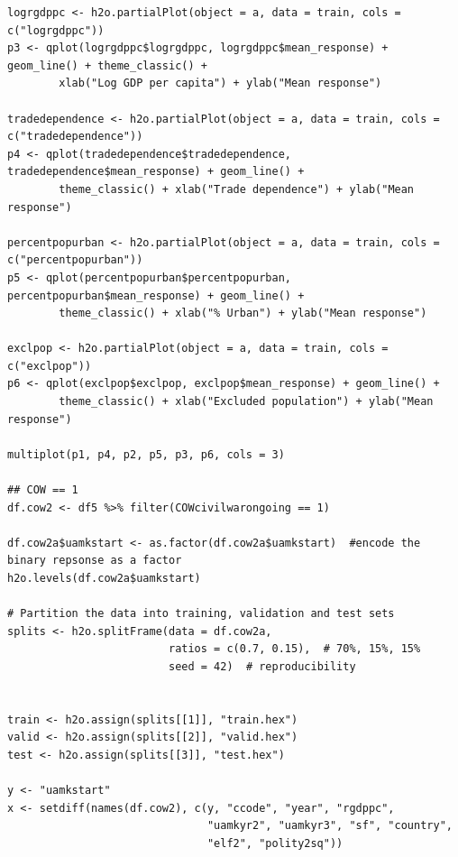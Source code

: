 \documentclass[a4paper,12pt]{article}
\begin{document}
\begin{verbatim}
logrgdppc <- h2o.partialPlot(object = a, data = train, cols = c("logrgdppc"))
p3 <- qplot(logrgdppc$logrgdppc, logrgdppc$mean_response) + geom_line() + theme_classic() +
        xlab("Log GDP per capita") + ylab("Mean response")

tradedependence <- h2o.partialPlot(object = a, data = train, cols = c("tradedependence"))
p4 <- qplot(tradedependence$tradedependence, tradedependence$mean_response) + geom_line() +
        theme_classic() + xlab("Trade dependence") + ylab("Mean response")

percentpopurban <- h2o.partialPlot(object = a, data = train, cols = c("percentpopurban"))
p5 <- qplot(percentpopurban$percentpopurban, percentpopurban$mean_response) + geom_line() +
        theme_classic() + xlab("% Urban") + ylab("Mean response")
        
exclpop <- h2o.partialPlot(object = a, data = train, cols = c("exclpop"))
p6 <- qplot(exclpop$exclpop, exclpop$mean_response) + geom_line() +
        theme_classic() + xlab("Excluded population") + ylab("Mean response")

multiplot(p1, p4, p2, p5, p3, p6, cols = 3)

## COW == 1
df.cow2 <- df5 %>% filter(COWcivilwarongoing == 1)

df.cow2a$uamkstart <- as.factor(df.cow2a$uamkstart)  #encode the binary repsonse as a factor
h2o.levels(df.cow2a$uamkstart)

# Partition the data into training, validation and test sets
splits <- h2o.splitFrame(data = df.cow2a, 
                         ratios = c(0.7, 0.15),  # 70%, 15%, 15%
                         seed = 42)  # reproducibility


train <- h2o.assign(splits[[1]], "train.hex")   
valid <- h2o.assign(splits[[2]], "valid.hex") 
test <- h2o.assign(splits[[3]], "test.hex")

y <- "uamkstart"
x <- setdiff(names(df.cow2), c(y, "ccode", "year", "rgdppc",
                               "uamkyr2", "uamkyr3", "sf", "country",
                               "elf2", "polity2sq")) 


\end{verbatim}
\end{document}
